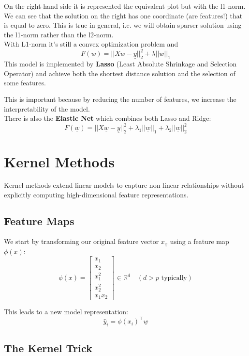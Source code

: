 On the right-hand side it is represented the equivalent plot but with the l1-norm. We can see that the solution on the right has one coordinate (are features!) that is equal to zero. This is true in general, i.e. we will obtain sparser solution using the l1-norm rather than the l2-norm.\\
With L1-norm it's still a convex optimization problem and
\[
    F(\underline{w}) = ||X\underline{w} - \underline{y}||_2^2 + \lambda ||\underline{w}||_1    
\] 
This model is implemented by \textbf{Lasso} (Least Absolute Shrinkage and Selection Operator) and achieve both the shortest distance solution and the selection of some features.

This is important because by reducing the number of features, we increase the interpretability of the model.\\

There is also the \textbf{Elastic Net} which combines both Lasso and Ridge: 
\[
    F(\underline{w}) = ||X\underline{w} - \underline{y}||_2^2 + \lambda_1||\underline{w}||_1 + \lambda_2||\underline{w}||_2^2  
\] 
\newpage
\section{Kernel Methods}

Kernel methods extend linear models to capture non-linear relationships without explicitly computing high-dimensional feature representations.

\subsection*{Feature Maps}

We start by transforming our original feature vector $x_\underline{x}$ using a feature map $\phi(x)$:
\[
    \phi(x) = \begin{bmatrix}
        x_1 \\ x_2 \\ x_1^2 \\ x_2^2 \\ x_1x_2
    \end{bmatrix} \in \mathbb{R}^d \quad (d > p \text{ typically})
\]

This leads to a new model representation:
\[
    \hat{y}_i = \phi(x_i)^\intercal \underline{w}
\]

\subsection*{The Kernel Trick}

